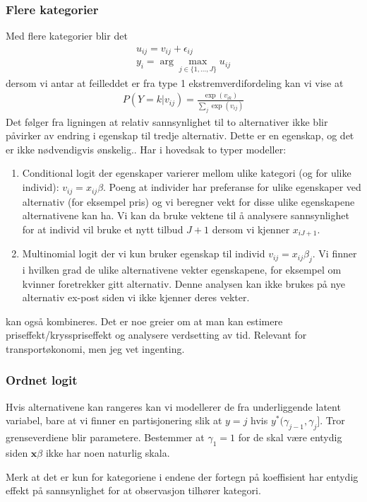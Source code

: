 \subsubsection{Flere kategorier}
Med flere kategorier blir det
\begin{align}
u_{ij} = v_{ij}+\epsilon_{ij} \\
y_i = \arg\max_{j \in \{1,\ldots,J\}}u_{ij}
\end{align}
dersom vi antar at feilleddet er fra type 1 ekstremverdifordeling kan vi vise at
\begin{align}
P(Y=k|v_{ij}) = \frac{\exp(v_{ik})}{\sum_j \exp(v_{ij})}
\end{align}
Det følger fra ligningen at relativ sannsynlighet til to alternativer ikke blir påvirker av endring i egenskap til tredje alternativ. Dette er en egenskap, og det er ikke nødvendigvis ønskelig.. Har i hovedsak to typer modeller:
\begin{enumerate}
\item Conditional logit der egenskaper varierer mellom ulike kategori (og for ulike individ): $v_{ij}=x_{ij} \beta$. Poeng at individer har preferanse for ulike egenskaper ved alternativ (for eksempel pris) og vi beregner vekt for disse ulike egenskapene alternativene kan ha. Vi kan da bruke vektene til å analysere sannsynlighet for at individ vil bruke et nytt tilbud $J+1$ dersom vi kjenner $x_{iJ+1}$.
\item Multinomial logit der vi kun bruker egenskap til individ $v_{ij}=x_{ij} \beta_j$. Vi finner i hvilken grad de ulike alternativene vekter egenskapene, for eksempel om kvinner foretrekker gitt alternativ. Denne analysen kan ikke brukes på nye alternativ ex-post siden vi ikke kjenner deres vekter.
\end{enumerate}
kan også kombineres. Det er noe greier om at man kan estimere priseffekt/krysspriseffekt og analysere verdsetting av tid. Relevant for transportøkonomi, men jeg vet ingenting. 
\subsubsection{Ordnet logit}
Hvis alternativene kan rangeres kan vi modellerer de fra underliggende latent variabel, bare at vi finner en partisjonering slik at $y=j$ hvis $y^*(\gamma_{j-1},\gamma_j]$. Tror grenseverdiene blir parametere. Bestemmer at $\gamma_1 = 1$ for de skal være entydig siden $\mathbf{x}\beta$ ikke har noen naturlig skala. 

Merk at det er kun for kategoriene i endene der fortegn på koeffisient har entydig effekt på sannsynlighet for at observasjon tilhører kategori.
